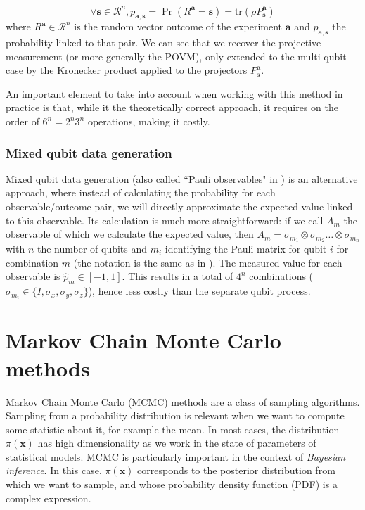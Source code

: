 \documentclass[12pt]{memoir}
\newcommand{\tr}{\text{tr}}
\newcommand{\mb}{\mathbf}
\newcommand{\ti}{\textit}
\begin{document}
\begin{equation}
    \forall \mb s \in \mathcal{R}^n, p_{\mb a,\mb s} = \Pr(R^{\mb a} = \mb s) = \tr(\rho P^{\mb a}_{\mb s})
\end{equation}
where $R^\mb{a} \in \mathcal{R}^n$ is the random vector outcome of the experiment $\mb a$ and $p_{\mb a,\mb s}$ the probability linked to that pair. We can see that we recover the projective measurement (or more generally the POVM), only extended to the multi-qubit case by the Kronecker product applied to the projectors $P^{\mb a}_\mb{ s}$.\medbreak

An important element to take into account when working with this method in practice is that, while it the theoretically correct approach, it requires on the order of $6^n = 2^n 3^n$ operations, making it costly.



\subsubsection*{Mixed qubit data generation}\label{section:mixed-qub-dg}

Mixed qubit data generation (also called ``Pauli observables" in \cite{Guta20}) is an alternative approach, where instead of calculating the probability for each observable/outcome pair, we will directly approximate the expected value linked to this observable. Its calculation is much more straightforward: if we call $A_m$ the observable of which we calculate the expected value, then $A_m = \sigma_{m_1} \otimes \sigma_{m_2} \dots \otimes \sigma_{m_n}$ with $n$ the number of qubits and $m_i$ identifying the Pauli matrix for qubit $i$ for combination $m$ (the notation is the same as in \cite{meth:bayesian:Langevin:ACMT2024}). The measured value for each observable is $\hat p_m \in[-1, 1]$. This results in a total of $4^n$ combinations ($\sigma_{m_i} \in \{I, \sigma_x, \sigma_y, \sigma_z\}$), hence less costly than the separate qubit process.

\newpage

\section{Markov Chain Monte Carlo methods}
Markov Chain Monte Carlo (MCMC) methods are a class of sampling algorithms. Sampling from a probability distribution is relevant when we want to compute some statistic about it, for example the mean. In most cases, the distribution $\pi(\mb x)$ has high dimensionality as we work in the state of parameters of statistical models. MCMC is particularly important in the context of \ti{Bayesian inference}. In this case, $\pi(\mb x)$ corresponds to the posterior distribution from which we want to sample, and whose probability density function (PDF) is a complex expression. \medbreak
\end{document}
